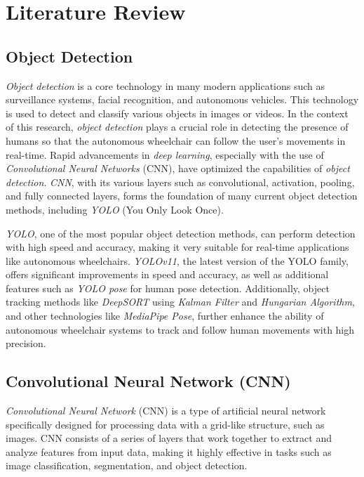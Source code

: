 \section{Literature Review}
\label{sec:literaturereview}

\subsection{Object Detection}
\label{subsec:detection}

\emph{Object detection} is a core technology in many modern applications such as surveillance systems, facial recognition, and autonomous vehicles. This technology is used to detect and classify various objects in images or videos. In the context of this research, \emph{object detection} plays a crucial role in detecting the presence of humans so that the autonomous wheelchair can follow the user's movements in real-time. Rapid advancements in \emph{deep learning}, especially with the use of \emph{Convolutional Neural Networks} (CNN), have optimized the capabilities of \emph{object detection}. \emph{CNN}, with its various layers such as convolutional, activation, pooling, and fully connected layers, forms the foundation of many current object detection methods, including \emph{YOLO} (You Only Look Once).

\emph{YOLO}, one of the most popular object detection methods, can perform detection with high speed and accuracy, making it very suitable for real-time applications like autonomous wheelchairs. \emph{YOLOv11}, the latest version of the YOLO family, offers significant improvements in speed and accuracy, as well as additional features such as \emph{YOLO pose} for human pose detection. Additionally, object tracking methods like \emph{DeepSORT} using \emph{Kalman Filter} and \emph{Hungarian Algorithm}, and other technologies like \emph{MediaPipe Pose}, further enhance the ability of autonomous wheelchair systems to track and follow human movements with high precision.

\subsection{Convolutional Neural Network (CNN)}
\label{subsec:cnn}

\emph{Convolutional Neural Network} (CNN) is a type of artificial neural network specifically designed for processing data with a grid-like structure, such as images. CNN consists of a series of layers that work together to extract and analyze features from input data, making it highly effective in tasks such as image classification, segmentation, and object detection.

